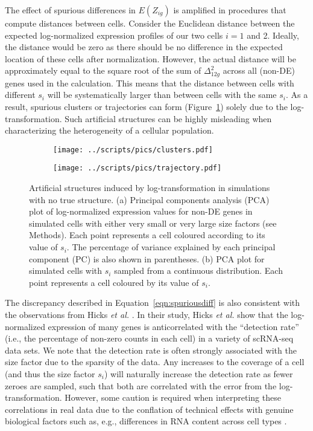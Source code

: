 \documentclass[10pt,letterpaper]{article}
\begin{document}
The effect of spurious differences in $E(Z_{ig})$ is amplified in procedures that compute distances between cells.
Consider the Euclidean distance between the expected log-normalized expression profiles of our two cells $i=1$ and 2.
Ideally, the distance would be zero as there should be no difference in the expected location of these cells after normalization.
However, the actual distance will be approximately equal to the square root of the sum of $\Delta_{12g}^2$ across all (non-DE) genes used in the calculation.
This means that the distance between cells with different $s_i$ will be systematically larger than between cells with the same $s_i$.
As a result, spurious clusters or trajectories can form (Figure~\ref{fig:structures}) solely due to the log-transformation.
Such artificial structures can be highly misleading when characterizing the heterogeneity of a cellular population.

\begin{figure}[btp]
\centering
\begin{subfigure}[b]{0.49\textwidth}
    \texttt{[image: ../scripts/pics/clusters.pdf]}
    \caption{}
\end{subfigure}
\begin{subfigure}[b]{0.49\textwidth}
    \texttt{[image: ../scripts/pics/trajectory.pdf]}
    \caption{}
\end{subfigure}
\caption{Artificial structures induced by log-transformation in simulations with no true structure.
(a) Principal components analysis (PCA) plot of log-normalized expression values for non-DE genes in simulated cells with either very small or very large size factors (see Methods).
Each point represents a cell coloured according to its value of $s_i$.
The percentage of variance explained by each principal component (PC) is also shown in parentheses. 
(b) PCA plot for simulated cells with $s_i$ sampled from a continuous distribution.
Each point represents a cell coloured by its value of $s_i$.
}
\label{fig:structures}
\end{figure}

The discrepancy described in Equation~\ref{eqn:spuriousdiff} is also consistent with the observations from Hicks \emph{et al.} \cite{hicks2017missing}.
In their study, Hicks \emph{et al.} show that the log-normalized expression of many genes is anticorrelated with the ``detection rate'' (i.e., the percentage of non-zero counts in each cell) in a variety of scRNA-seq data sets.
We note that the detection rate is often strongly associated with the size factor due to the sparsity of the data.
Any increases to the coverage of a cell (and thus the size factor $s_i$) will naturally increase the detection rate as fewer zeroes are sampled,
such that both are correlated with the error from the log-transformation.
However, some caution is required when interpreting these correlations in real data due to the conflation of technical effects with genuine biological factors such as, e.g., differences in RNA content across cell types \cite{islam2011characterization,lun2017assessing}.
\end{document}
